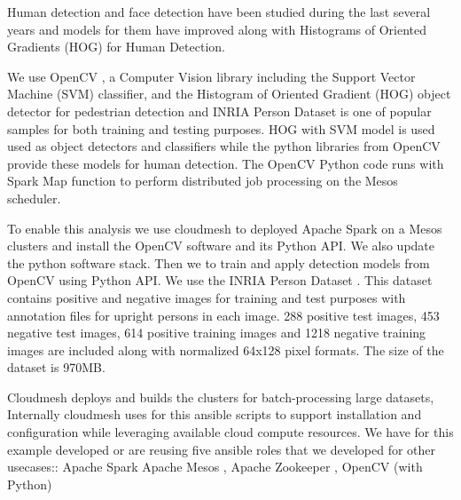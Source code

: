 
Human detection and face detection have been studied during the last
several years and models for them have improved along with Histograms
of Oriented Gradients (HOG) \cite{dalal2005histograms} for Human Detection. 



We use OpenCV \cite{bradski2000opencv}, a Computer Vision library including the
Support Vector Machine (SVM) classifier, and the Histogram of Oriented
Gradient (HOG) \cite{dalal2005histograms}object detector for pedestrian detection and
INRIA Person Dataset is one of popular samples for both training and
testing purposes. HOG with SVM model is used used as object detectors
and classifiers while the python libraries from OpenCV provide these
models for human detection.  The OpenCV Python code runs with Spark
Map function to perform distributed job processing on the Mesos
scheduler.

To enable this analysis we use cloudmesh to deployed Apache Spark on a
Mesos clusters and install the OpenCV software and its Python API. We
also update the python software stack. Then we to train and apply
detection models from OpenCV using Python API. We use the INRIA Person
Dataset \cite{dalal2005inria}. This dataset contains positive and negative images for
training and test purposes with annotation files for upright persons in each
image. 288 positive test images, 453 negative test images, 614 positive
training images and 1218 negative training images are included along with
normalized 64x128 pixel formats. The size of the dataset is 970MB.

Cloudmesh deploys and builds the clusters for batch-processing large
datasets, Internally cloudmesh uses for this ansible scripts to
support installation and configuration while leveraging available
cloud compute resources. We have for this example developed or are
reusing five ansible roles that we developed for other usecases::
Apache Spark \cite{ansible-role-spark}
Apache Mesos \cite{hindman2011mesos}, Apache Zookeeper
\cite{hunt2010zookeeper}, 
  OpenCV (with Python) \cite{ansible-role-opencv}



\cite{nist-facedetection}



